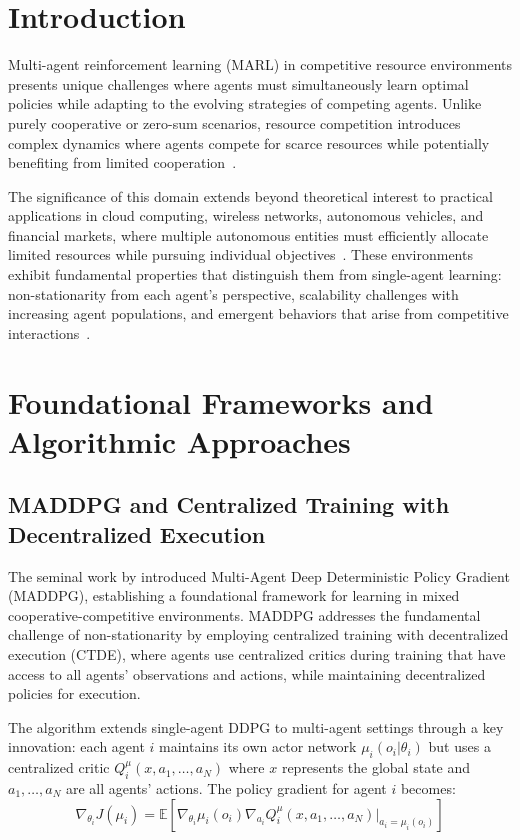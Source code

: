 \section{Introduction}

Multi-agent reinforcement learning (MARL) in competitive resource environments presents unique challenges where agents must simultaneously learn optimal policies while adapting to the evolving strategies of competing agents. Unlike purely cooperative or zero-sum scenarios, resource competition introduces complex dynamics where agents compete for scarce resources while potentially benefiting from limited cooperation~\autocite{lowe_multi-agent_2017}. 

The significance of this domain extends beyond theoretical interest to practical applications in cloud computing, wireless networks, autonomous vehicles, and financial markets, where multiple autonomous entities must efficiently allocate limited resources while pursuing individual objectives~\autocite{wang_qplex_2021, allahham_multi-agent_2022}. These environments exhibit fundamental properties that distinguish them from single-agent learning: non-stationarity from each agent's perspective, scalability challenges with increasing agent populations, and emergent behaviors that arise from competitive interactions~\autocite{hernandez-leal_survey_2019, ning_survey_2024}.

\section{Foundational Frameworks and Algorithmic Approaches}

\subsection{MADDPG and Centralized Training with Decentralized Execution}

The seminal work by \textcite{lowe_multi-agent_2017} introduced Multi-Agent Deep Deterministic Policy Gradient (MADDPG), establishing a foundational framework for learning in mixed cooperative-competitive environments. MADDPG addresses the fundamental challenge of non-stationarity by employing centralized training with decentralized execution (CTDE), where agents use centralized critics during training that have access to all agents' observations and actions, while maintaining decentralized policies for execution.

The algorithm extends single-agent DDPG to multi-agent settings through a key innovation: each agent $i$ maintains its own actor network $\mu_i(o_i|\theta_i)$ but uses a centralized critic $Q_i^\mu(x, a_1, \ldots, a_N)$ where $x$ represents the global state and $a_1, \ldots, a_N$ are all agents' actions. The policy gradient for agent $i$ becomes:
\begin{equation}
    \nabla_{\theta_i} J(\mu_i) = \mathbb{E}[\nabla_{\theta_i} \mu_i(o_i) \nabla_{a_i} Q_i^\mu(x, a_1, \ldots, a_N)|_{a_i=\mu_i(o_i)}]
\end{equation}

